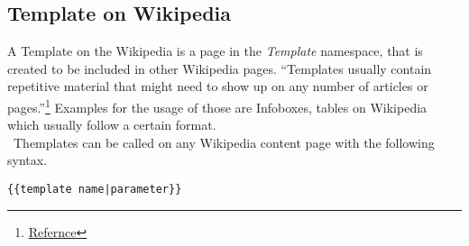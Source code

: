 \subsection{Template on Wikipedia}

A Template on the Wikipedia is a page in the \textit{Template} namespace, that is created to be included in other Wikipedia pages. ``Templates usually contain repetitive material that might need to show up on any number of articles or pages.''\footnote{\href{https://en.wikipedia.org/wiki/Help:Template}{Refernce}} Examples for the usage of those are Infoboxes, tables on Wikipedia which usually follow a certain format. \\\
Themplates can be called on any Wikipedia content page with the following syntax. \\
\begin{lstlisting}[frame=single] 
{{template name|parameter}}
\end{lstlisting}